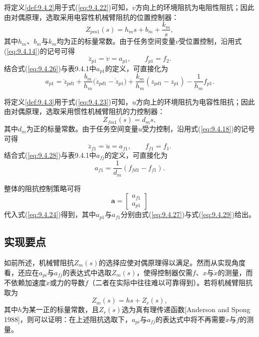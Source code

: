 \documentclass[12pt,a4paper]{ctexart}
\begin{document}
将定义\ref{def:9.4.2}用于式(\ref{eq:9.4.22})可知，$v$方向上的环境阻抗为电阻性阻抗；因此由对偶原理，选取采用电容性机械臂阻抗的位置控制器：
\begin{equation}\label{eq:9.4.26}
Z_{pm1}(s) = h_m s + b_m + \frac{k_m}{s},
\end{equation}
其中$h_m$、$b_m$与$k_m$均为正的标量常数。由于任务空间变量$v$受位置控制，沿用式(\ref{eq:9.4.14})的记号可得
\[
\ddot{z}_{p1} = \ddot{v} = a_{p1}, \qquad f_{p1} = f_2.
\]
结合式(\ref{eq:9.4.26})与表9.4.1中$a_{p1}$的定义，可直接化为
\begin{equation}\label{eq:9.4.27}
a_{p1} = \ddot{z}_{pd1} + \frac{b_m}{h_m}\bigl(\dot{z}_{pd1} - \dot{z}_{p1}\bigr) + \frac{k_m}{h_m}(z_{pd1} - z_{p1}) - \frac{1}{h_m} f_{p1}.
\end{equation}

将定义\ref{def:9.4.3}用于式(\ref{eq:9.4.23})可知，$u$方向上的环境阻抗为电容性阻抗；因此由对偶原理，选取采用惯性机械臂阻抗的力控制器：
\begin{equation}\label{eq:9.4.28}
Z_{fm1}(s) = d_m s,
\end{equation}
其中$d_m$为正的标量常数。由于任务空间变量$u$受力控制，沿用式(\ref{eq:9.4.18})的记号可得
\[
\ddot{z}_{f1} = \ddot{u} = a_{f1}, \qquad f_{f1} = f_1.
\]
结合式(\ref{eq:9.4.28})与表9.4.1中$a_{fj}$的定义，可直接化为
\begin{equation}\label{eq:9.4.29}
a_{f1} = \frac{1}{d_m}(f_{fd1} - f_{f1}).
\end{equation}

整体的阻抗控制策略可将
\begin{equation}\label{eq:9.4.30}
\mathbf{a} = \begin{bmatrix} a_{f1} \\ a_{p1} \end{bmatrix}
\end{equation}
代入式(\ref{eq:9.4.24})得到，其中$a_{p1}$与$a_{f1}$分别由式(\ref{eq:9.4.27})与式(\ref{eq:9.4.29})给出。

\subsection{实现要点}

如前所述，机械臂阻抗$Z_m(s)$的选择应使对偶原理得以满足。然而从实现角度看，还应在$a_{pi}$与$a_{fj}$的表达式中选取$Z_m(s)$，使得控制器仅需$f$、$x$与$\dot{x}$的测量，而不依赖加速度$\ddot{x}$或力的导数$\dot{f}$（二者在实际中往往难以可靠得到）。若将机械臂阻抗取为
\begin{equation}\label{eq:9.4.31}
Z_m(s) = hs + Z_r(s),
\end{equation}
其中$h$为某一正的标量常数，且$Z_r(s)$选为真有理传递函数[Anderson and Spong 1988]，则可以证明：在上述阻抗选取下，$a_{pi}$与$a_{fj}$的表达式中将不再需要$\ddot{x}$与$\dot{f}$的测量。
\end{document}

